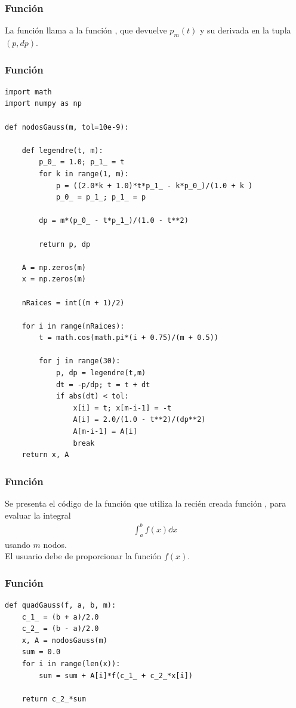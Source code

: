 \begin{frame}
\frametitle{Función }
La función  llama a la función , que devuelve $p_{m}(t)$ y su derivada en la tupla $(p, dp)$.
\end{frame}
\begin{frame}
\frametitle{Función }
\begin{lstlisting}[caption=Código para la función nodosGauss, style=FormattedNumber, basicstyle=\linespread{1.1}\ttfamily=\tiny, columns=fullflexible]
import math
import numpy as np

def nodosGauss(m, tol=10e-9):
	
	def legendre(t, m):
		p_0_ = 1.0; p_1_ = t
		for k in range(1, m):
			p = ((2.0*k + 1.0)*t*p_1_ - k*p_0_)/(1.0 + k )
			p_0_ = p_1_; p_1_ = p
		
		dp = m*(p_0_ - t*p_1_)/(1.0 - t**2)
		
		return p, dp
	
	A = np.zeros(m)
	x = np.zeros(m)
	
	nRaices = int((m + 1)/2)
	
	for i in range(nRaices):
		t = math.cos(math.pi*(i + 0.75)/(m + 0.5))
		
		for j in range(30):
			p, dp = legendre(t,m)
			dt = -p/dp; t = t + dt
			if abs(dt) < tol:
				x[i] = t; x[m-i-1] = -t
				A[i] = 2.0/(1.0 - t**2)/(dp**2)
				A[m-i-1] = A[i]
				break
	return x, A
\end{lstlisting}
\end{frame}
\begin{frame}
\frametitle{Función }
Se presenta el código de la función  que utiliza la recién creada función , para evaluar la integral
\begin{align*}
\int_{a}^{b} f(x) \dd{x}
\end{align*}
usando $m$ nodos.
\\
\bigskip
El usuario debe de proporcionar la función $f(x)$.
\end{frame}
\begin{frame}
\frametitle{Función }
\begin{lstlisting}[caption=Código para la función nodosGauss, style=FormattedNumber, basicstyle=\linespread{1.1}\ttfamily=\tiny, columns=fullflexible]
def quadGauss(f, a, b, m):
	c_1_ = (b + a)/2.0
	c_2_ = (b - a)/2.0
	x, A = nodosGauss(m)
	sum = 0.0
	for i in range(len(x)):
		sum = sum + A[i]*f(c_1_ + c_2_*x[i])

    return c_2_*sum
\end{lstlisting}
\end{frame}
